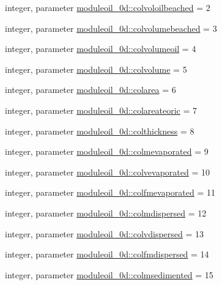 \begin{DoxyCompactItemize}
\item 
integer, parameter \mbox{\hyperlink{namespacemoduleoil__0d_aa5bb72fac4bf1e73d8e2caea25e5f2a4}{moduleoil\+\_\+0d\+::colvoloilbeached}} = 2
\item 
integer, parameter \mbox{\hyperlink{namespacemoduleoil__0d_a06f64ceb8a0d28323a220ffcae113757}{moduleoil\+\_\+0d\+::colvolumebeached}} = 3
\item 
integer, parameter \mbox{\hyperlink{namespacemoduleoil__0d_ab7ecfed21e75bfa5133463c5decf799c}{moduleoil\+\_\+0d\+::colvolumeoil}} = 4
\item 
integer, parameter \mbox{\hyperlink{namespacemoduleoil__0d_ad525ad382949ff29ea3a012e8f1b5062}{moduleoil\+\_\+0d\+::colvolume}} = 5
\item 
integer, parameter \mbox{\hyperlink{namespacemoduleoil__0d_a89442890dd53f90c6af5c8a26b889094}{moduleoil\+\_\+0d\+::colarea}} = 6
\item 
integer, parameter \mbox{\hyperlink{namespacemoduleoil__0d_a56d9cfb8b48bd36fa33bd400ec99a285}{moduleoil\+\_\+0d\+::colareateoric}} = 7
\item 
integer, parameter \mbox{\hyperlink{namespacemoduleoil__0d_ac9241372e9a6c314354df1be11c845a0}{moduleoil\+\_\+0d\+::colthickness}} = 8
\item 
integer, parameter \mbox{\hyperlink{namespacemoduleoil__0d_a57ec2a70d2b008984a4689b8aa529ceb}{moduleoil\+\_\+0d\+::colmevaporated}} = 9
\item 
integer, parameter \mbox{\hyperlink{namespacemoduleoil__0d_a71576d5d09ccfb4a02110fe478b30e6a}{moduleoil\+\_\+0d\+::colvevaporated}} = 10
\item 
integer, parameter \mbox{\hyperlink{namespacemoduleoil__0d_a1d23e12f7d30e98ee069d56753f1baff}{moduleoil\+\_\+0d\+::colfmevaporated}} = 11
\item 
integer, parameter \mbox{\hyperlink{namespacemoduleoil__0d_a040cd3f93ec55bab011ced375ccbecd0}{moduleoil\+\_\+0d\+::colmdispersed}} = 12
\item 
integer, parameter \mbox{\hyperlink{namespacemoduleoil__0d_a8e81392cc9310753c1ec679a479eaab2}{moduleoil\+\_\+0d\+::colvdispersed}} = 13
\item 
integer, parameter \mbox{\hyperlink{namespacemoduleoil__0d_a12e7175fbde33d7ea29f4e119fffa797}{moduleoil\+\_\+0d\+::colfmdispersed}} = 14
\item 
integer, parameter \mbox{\hyperlink{namespacemoduleoil__0d_a34a93f10c4faaccb7a2f38b2ff7a40b1}{moduleoil\+\_\+0d\+::colmsedimented}} = 15
\item 

\end{DoxyCompactItemize}
